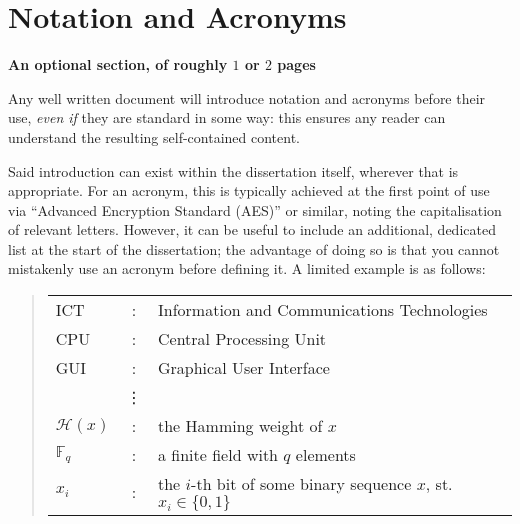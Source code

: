 \documentclass[ %
                    author={Jonathan Rankin},
                supervisor={Dr. David May, Dr. Ian Holyer},
                    degree={MEng},
                     title={CodeTouch},
                  subtitle={A Revolutionary Way To Program Real Code On Touch Screen Devices},
                      type={enterprise},
                      year={2015 } ]{dissertation}
\begin{document}

\chapter*{Notation and Acronyms}

{\bf An optional section, of roughly $1$ or $2$ pages}
\vspace{1cm} 

\noindent
Any well written document will introduce notation and acronyms before
their use, {\em even if} they are standard in some way: this ensures 
any reader can understand the resulting self-contained content.  

Said introduction can exist within the dissertation itself, wherever 
that is appropriate.  For an acronym, this is typically achieved at 
the first point of use via ``Advanced Encryption Standard (AES)'' or 
similar, noting the capitalisation of relevant letters.  However, it 
can be useful to include an additional, dedicated list at the start 
of the dissertation; the advantage of doing so is that you cannot 
mistakenly use an acronym before defining it.  A limited example is 
as follows:

\begin{quote}
\noindent
\begin{tabular}{lcl}
ICT               &:     & Information and Communications Technologies                                        \\
CPU                &:     & Central Processing Unit                                            \\
GUI            &:     & Graphical User Interface                                      \\

                    &\vdots&                                                                      \\
${\mathcal H}( x )$ &:     & the Hamming weight of $x$                                            \\
${\mathbb  F}_q$    &:     & a finite field with $q$ elements                                     \\
$x_i$               &:     & the $i$-th bit of some binary sequence $x$, st. $x_i \in \{ 0, 1 \}$ \\
\end{tabular}
\end{quote}

\end{document}

